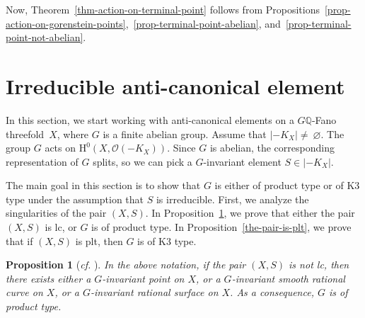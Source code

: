 \documentclass[11pt]{amsart}
\numberwithin{equation}{section}
\newtheorem{proposition}[thm]{Proposition}
\theoremstyle{definition}
\theoremstyle{remark}
\newcommand{\OOO}{\mathscr{O}}
\let\emptyset\varnothing
\begin{document}
Now, Theorem~\ref{thm-action-on-terminal-point} follows from Propositions~\ref{prop-action-on-gorenstein-points},~\ref{prop-terminal-point-abelian}, and~\ref{prop-terminal-point-not-abelian}. 

\section{Irreducible anti-canonical element}
\label{sec-sing-of-pair}
\label{sec-geom-anti-can-notation}
\label{sect-special-case}

In this section, we start working with anti-canonical elements on a $G\mathbb{Q}$-Fano threefold~$X$, where $G$ is a finite abelian group. 
Assume that $|-K_X|\neq~
\emptyset$. The group $G$ acts on
$\mathrm{H}^0(X, \OOO(-K_X))$. Since $G$ is abelian, the corresponding representation of $G$ splits, so we can pick a $G$-invariant element
$S\in |-K_X|$. 

The main goal in this section is to show that $G$ is either of product type or of K3 type under the assumption that $S$ is irreducible. 
First, we analyze the singularities of the pair $(X, S)$. 
In Proposition~\ref{the-pair-is-lc}, we prove that either the pair $(X, S)$ is lc, or $G$ is of product type. In Proposition~\ref{the-pair-is-plt}, we prove that if $(X, S)$ is plt, then $G$ is of K3 type. 

\begin{proposition}[\textit{cf.} {\cite[2.9]{Pr11}}]
\label{the-pair-is-lc}
In the above notation,
if the pair $(X, S)$ is not lc, then there exists either a
$G$-invariant point on $X$, or a $G$-invariant smooth rational curve on $X$, or a $G$-invariant rational surface on $X$. 
As a consequence, $G$ is of product type. 
\end{proposition}
\end{document}
